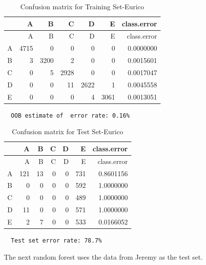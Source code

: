 \documentclass[12pt,twoside]{reedthesis}
\begin{document}
  \begin{longtable}[c]{@{}lrrrrrr@{}}
  \caption{Confusion matrix for Training Set-Eurico}\tabularnewline
  \toprule
  & A & B & C & D & E & class.error\tabularnewline
  \midrule
  \endfirsthead
  \toprule
  & A & B & C & D & E & class.error\tabularnewline
  \midrule
  \endhead
  A & 4715 & 0 & 0 & 0 & 0 & 0.0000000\tabularnewline
  B & 3 & 3200 & 2 & 0 & 0 & 0.0015601\tabularnewline
  C & 0 & 5 & 2928 & 0 & 0 & 0.0017047\tabularnewline
  D & 0 & 0 & 11 & 2622 & 1 & 0.0045558\tabularnewline
  E & 0 & 0 & 0 & 4 & 3061 & 0.0013051\tabularnewline
  \bottomrule
  \end{longtable}
  
  \begin{verbatim}
  OOB estimate of  error rate: 0.16%
  \end{verbatim}
  
  \begin{longtable}[c]{@{}lrrrrrr@{}}
  \caption{Confusion matrix for Test Set-Eurico}\tabularnewline
  \toprule
  & A & B & C & D & E & class.error\tabularnewline
  \midrule
  \endfirsthead
  \toprule
  & A & B & C & D & E & class.error\tabularnewline
  \midrule
  \endhead
  A & 121 & 13 & 0 & 0 & 731 & 0.8601156\tabularnewline
  B & 0 & 0 & 0 & 0 & 592 & 1.0000000\tabularnewline
  C & 0 & 0 & 0 & 0 & 489 & 1.0000000\tabularnewline
  D & 11 & 0 & 0 & 0 & 571 & 1.0000000\tabularnewline
  E & 2 & 7 & 0 & 0 & 533 & 0.0166052\tabularnewline
  \bottomrule
  \end{longtable}
  
  \begin{verbatim}
  Test set error rate: 78.7%
  \end{verbatim}
  
  \newpage
  
  The next random forest uses the data from Jeremy as the test set.
  
  \begin{Shaded}
  \begin{Highlighting}[]
  \NormalTok{(}\NormalTok{)}
  
  \StringTok{ }\NormalTok{wl2[wl2$user_name ==}\StringTok{ }\NormalTok{subjects[}\NormalTok{], ]}
  \StringTok{ }\NormalTok{wl2[wl2$user_name !=}\StringTok{ }\NormalTok{subjects[}\NormalTok{], ]}
  \StringTok{ }\NormalTok{(} \NormalTok{OtherSubs5[, }\NormalTok{:}\NormalTok{], } 
                                  \NormalTok{Sub5[, }\NormalTok{:}\NormalTok{], } 
                                  \NormalTok{)}
  \end{Highlighting}
  \end{Shaded}
  
\end{document}
